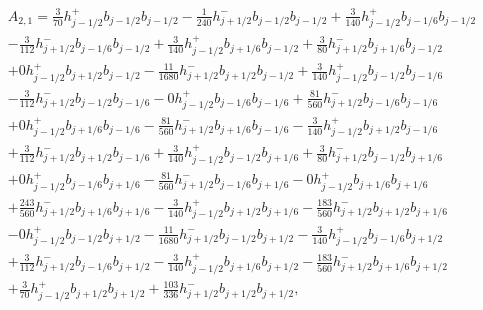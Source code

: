 \documentclass[12pt]{article}
\begin{document}
\begin{multline*} A_{2,1} = \frac{3}{70} h_{j-1/2}^+ b_{j-1/2} b_{j-1/2}-\frac{1}{240} h_{j+1/2}^- b_{j-1/2} b_{j-1/2}+\frac{3}{140} h_{j-1/2}^+ b_{j-1/6} b_{j-1/2}\\-\frac{3}{112} h_{j+1/2}^- b_{j-1/6} b_{j-1/2}+\frac{3}{140} h_{j-1/2}^+ b_{j+1/6} b_{j-1/2}+\frac{3}{80} h_{j+1/2}^- b_{j+1/6} b_{j-1/2}\\+0 h_{j-1/2}^+ b_{j+1/2} b_{j-1/2}-\frac{11}{1680} h_{j+1/2}^- b_{j+1/2} b_{j-1/2}+\frac{3}{140} h_{j-1/2}^+ b_{j-1/2} b_{j-1/6}\\-\frac{3}{112} h_{j+1/2}^- b_{j-1/2} b_{j-1/6}-0 h_{j-1/2}^+ b_{j-1/6} b_{j-1/6}+\frac{81}{560} h_{j+1/2}^- b_{j-1/6} b_{j-1/6}\\+0 h_{j-1/2}^+ b_{j+1/6} b_{j-1/6}-\frac{81}{560} h_{j+1/2}^- b_{j+1/6} b_{j-1/6}-\frac{3}{140} h_{j-1/2}^+ b_{j+1/2} b_{j-1/6}\\+\frac{3}{112} h_{j+1/2}^- b_{j+1/2} b_{j-1/6}+\frac{3}{140} h_{j-1/2}^+ b_{j-1/2} b_{j+1/6}+\frac{3}{80} h_{j+1/2}^- b_{j-1/2} b_{j+1/6}\\+0 h_{j-1/2}^+ b_{j-1/6} b_{j+1/6}-\frac{81}{560} h_{j+1/2}^- b_{j-1/6} b_{j+1/6}-0 h_{j-1/2}^+ b_{j+1/6} b_{j+1/6}\\+\frac{243}{560} h_{j+1/2}^- b_{j+1/6} b_{j+1/6}-\frac{3}{140} h_{j-1/2}^+ b_{j+1/2} b_{j+1/6}-\frac{183}{560} h_{j+1/2}^- b_{j+1/2} b_{j+1/6}\\-0 h_{j-1/2}^+ b_{j-1/2} b_{j+1/2}-\frac{11}{1680} h_{j+1/2}^- b_{j-1/2} b_{j+1/2}-\frac{3}{140} h_{j-1/2}^+ b_{j-1/6} b_{j+1/2}\\+\frac{3}{112} h_{j+1/2}^- b_{j-1/6} b_{j+1/2}-\frac{3}{140} h_{j-1/2}^+ b_{j+1/6} b_{j+1/2}-\frac{183}{560} h_{j+1/2}^- b_{j+1/6} b_{j+1/2}\\+\frac{3}{70} h_{j-1/2}^+ b_{j+1/2} b_{j+1/2}+\frac{103}{336} h_{j+1/2}^- b_{j+1/2} b_{j+1/2}, \end{multline*}
\end{document}
